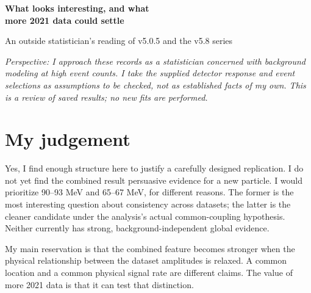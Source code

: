 \documentclass[11pt]{article}
\begin{document}
\begin{center}{\LARGE\bfseries What looks interesting, and what\\more 2021 data could settle}\par\vspace{7pt}
{\large An outside statistician's reading of v5.0.5 and the v5.8 series}
\end{center}
\noindent\textit{Perspective: I approach these records as a statistician concerned with background modeling at high event counts. I take the supplied detector response and event selections as assumptions to be checked, not as established facts of my own. This is a review of saved results; no new fits are performed.}

\section*{My judgement}
Yes, I find enough structure here to justify a carefully designed replication. I do not yet find the combined result persuasive evidence for a new particle. I would prioritize 90--93 MeV and 65--67 MeV, for different reasons. The former is the most interesting question about consistency across datasets; the latter is the cleaner candidate under the analysis's actual common-coupling hypothesis. Neither currently has strong, background-independent global evidence.

My main reservation is that the combined feature becomes stronger when the physical relationship between the dataset amplitudes is relaxed. A common location and a common physical signal rate are different claims. The value of more 2021 data is that it can test that distinction.
\end{document}
